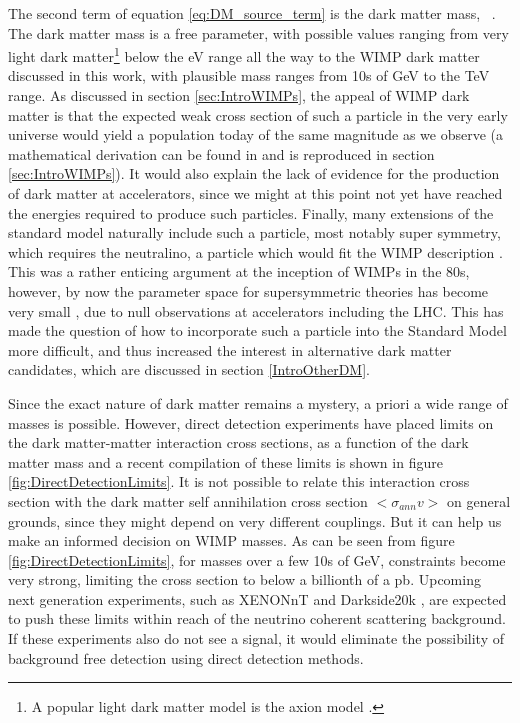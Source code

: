 The second term of equation \ref{eq:DM_source_term} is the dark matter mass, \dmm\ . The dark matter mass is a free parameter, with possible values ranging from very light dark matter\footnote{A popular light dark matter model is the axion model \cite{axion_review}.} below the eV range all the way to the WIMP dark matter discussed in this work, with plausible mass ranges from 10s of GeV to the TeV range. As discussed in section \ref{sec:IntroWIMPs}, the appeal of WIMP dark matter is that the expected weak cross section of such a particle in the very early universe would yield a population today of the same magnitude as we observe (a mathematical derivation can be found in \cite{dark matter production in the early universe} and is reproduced in section \ref{sec:IntroWIMPs}). It would also explain the lack of evidence for the production of dark matter at accelerators, since we might at this point not yet have reached the energies required to produce such particles. Finally, many extensions of the standard model naturally include such a particle, most notably super symmetry, which requires the neutralino, a particle which would fit the WIMP description \cite{Supersymmetry_primer}. This was a rather enticing argument at the inception of WIMPs in the 80s, however, by now the parameter space for supersymmetric theories has become very small \cite{Supersymmetry_primer}, due to null observations at accelerators including the LHC. This has made the question of how to incorporate such a particle into the Standard Model more difficult, and thus increased the interest in alternative dark matter candidates, which are discussed in section \ref{IntroOtherDM}.           



Since the exact nature of dark matter remains a mystery, a priori a wide range of masses is possible. However, direct detection experiments have placed limits on the dark matter-matter interaction cross sections, as a function of the dark matter mass \cite{XENON2, Lux} and a recent compilation of these limits is shown in figure \ref{fig:DirectDetectionLimits}. It is not possible to relate this interaction cross section with the dark matter self annihilation cross section $<\sigma_{ann} v>$ on general grounds, since they might depend on very different couplings. But it can help us make an informed decision on WIMP masses. As can be seen from figure \ref{fig:DirectDetectionLimits}, for masses over a few 10s of GeV, constraints become very strong, limiting the cross section to below a billionth of a pb. Upcoming next generation experiments, such as XENONnT \cite{XENON_new_physics} and Darkside20k \cite{Aalseth_2018}, are expected to push these limits within reach of the neutrino coherent scattering background. If these experiments also do not see a signal, it would eliminate the possibility of background free detection using direct detection methods. 

